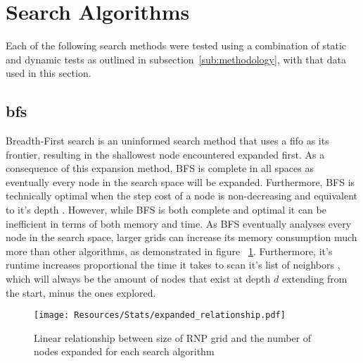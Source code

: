 \section{Search Algorithms} %
\label{sec:search_algorithms}
Each of the following search methods were tested using a combination of static and dynamic tests as outlined in subsection~\ref{sub:methodology}, with that data used in this section.

\subsection{\texorpdfstring{\acrfull{bfs}}{BFS}} %
\label{sub:bfs}
Breadth-First search is an uninformed search method that uses a \acrfull{fifo} as its frontier, resulting in the shallowest node encountered expanded first. As a consequence of this expansion method, BFS is \gls{complete} in all spaces as eventually every node in the search space will be expanded. Furthermore, BFS is technically \gls{optimal} when the step cost of a node is non-decreasing and equivalent to it's depth \parencite[82]{aiama}. However, while BFS is both complete and optimal it can be inefficient in terms of both memory and time. As BFS eventually analyses every node in the search space, larger grids can increase its memory consumption much more than other algorithms, as demonstrated in figure ~\ref{fig:expanded_relationship}. Furthermore, it's runtime increases proportional the time it takes to scan it's list of neighbors \parencite[597]{introalgos}, which will always be the amount of nodes that exist at depth $d$ extending from the start, minus the ones explored.

\begin{figure}[H]
	\centerline{
		\texttt{[image: Resources/Stats/expanded\_relationship.pdf]}
	}
	\caption{\small Linear relationship between size of RNP grid and the number of nodes expanded for each search algorithm}
	\label{fig:expanded_relationship}
\end{figure}

